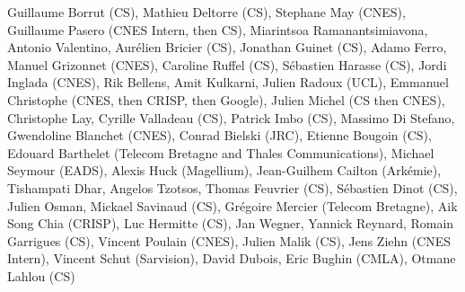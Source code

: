 Guillaume Borrut (CS), Mathieu Deltorre (CS), Stephane May (CNES), Guillaume Pasero (CNES Intern, then CS), Miarintsoa Ramanantsimiavona, Antonio Valentino, Aur\'elien Bricier (CS), Jonathan Guinet (CS), Adamo Ferro, Manuel Grizonnet (CNES), Caroline Ruffel (CS), S\'ebastien Harasse (CS), Jordi Inglada (CNES), Rik Bellens, Amit Kulkarni, Julien Radoux (UCL), Emmanuel Christophe (CNES, then CRISP, then Google), Julien Michel (CS then CNES), Christophe Lay, Cyrille Valladeau (CS), Patrick Imbo (CS), Massimo Di Stefano, Gwendoline Blanchet (CNES), Conrad Bielski (JRC), Etienne Bougoin (CS), Edouard Barthelet (Telecom Bretagne and Thales Communications), Michael Seymour (EADS), Alexis Huck (Magellium), Jean-Guilhem Cailton (Ark\'emie), Tishampati Dhar, Angelos Tzotsos, Thomas Feuvrier (CS), S\'ebastien Dinot (CS), Julien Osman, Mickael Savinaud (CS), Gr\'egoire Mercier (Telecom Bretagne), Aik Song Chia (CRISP), Luc Hermitte (CS), Jan Wegner, Yannick Reynard, Romain Garrigues (CS), Vincent Poulain (CNES), Julien Malik (CS), Jens Ziehn (CNES Intern), Vincent Schut (Sarvision), David Dubois, Eric Bughin (CMLA), Otmane Lahlou (CS)